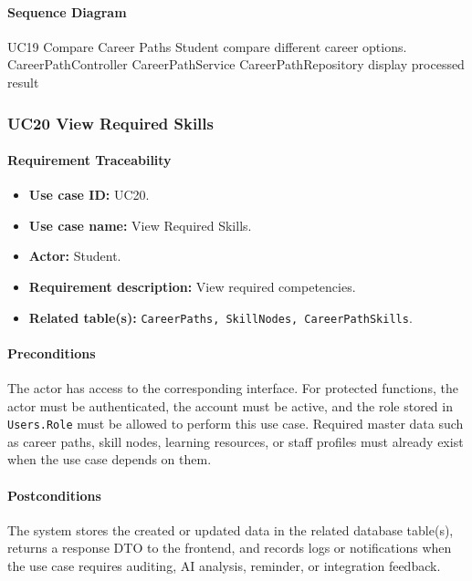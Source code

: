 \paragraph{Sequence Diagram}

\SequenceDiagram
{UC19 Compare Career Paths}
{Student}
{compare different career options.}
{CareerPathController}
{CareerPathService}
{CareerPathRepository}
{display processed result}

\subsubsection{UC20 View Required Skills}

\paragraph{Requirement Traceability}

\begin{itemize}
    \item \textbf{Use case ID:} UC20.
    \item \textbf{Use case name:} View Required Skills.
    \item \textbf{Actor:} Student.
    \item \textbf{Requirement description:} View required competencies.
    \item \textbf{Related table(s):} \texttt{CareerPaths, SkillNodes, CareerPathSkills}.
\end{itemize}

\paragraph{Preconditions}

The actor has access to the corresponding interface. For protected functions, the actor must be authenticated, the account must be active, and the role stored in \texttt{Users.Role} must be allowed to perform this use case. Required master data such as career paths, skill nodes, learning resources, or staff profiles must already exist when the use case depends on them.

\paragraph{Postconditions}

The system stores the created or updated data in the related database table(s), returns a response DTO to the frontend, and records logs or notifications when the use case requires auditing, AI analysis, reminder, or integration feedback.


